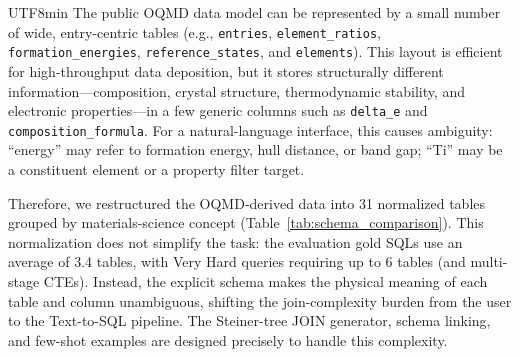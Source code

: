 \documentclass[sn-mathphys,Numbered]{sn-jnl}
\begin{document}
\begin{CJK}{UTF8}{min}
The public OQMD data model can be represented by a small number of
wide, entry-centric tables (e.g., \texttt{entries},
\texttt{element\_ratios}, \texttt{formation\_energies},
\texttt{reference\_states}, and \texttt{elements}).
This layout is efficient for high-throughput data deposition, but it
stores structurally different information---composition, crystal
structure, thermodynamic stability, and electronic properties---in a
few generic columns such as \texttt{delta\_e} and
\texttt{composition\_formula}.
For a natural-language interface, this causes ambiguity:
``energy'' may refer to formation energy, hull distance, or band gap;
``Ti'' may be a constituent element or a property filter target.

Therefore, we restructured the OQMD-derived data into 31 normalized
tables grouped by materials-science concept
(Table~\ref{tab:schema_comparison}).
This normalization does not simplify the task: the evaluation gold
SQLs use an average of 3.4 tables, with Very Hard queries requiring
up to 6 tables (and multi-stage CTEs).
Instead, the explicit schema makes the physical meaning of each
table and column unambiguous, shifting the join-complexity burden
from the user to the Text-to-SQL pipeline.
The Steiner-tree JOIN generator, schema linking, and few-shot examples
are designed precisely to handle this complexity.


\end{CJK}
\end{document}
